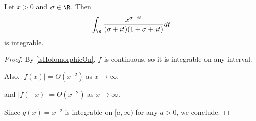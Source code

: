 \begin{lemma}[isIntegrable]
\label{isIntegrable}
\leanok
Let $x>0$ and $\sigma\in\R$. Then
  $$\int_{\R}\frac{x^{\sigma+it}}{(\sigma+it)(1+\sigma + it)}dt$$
  is integrable.
\end{lemma}
\begin{proof}
\leanok
By \ref{isHolomorphicOn}, $f$ is continuous, so it is integrable on any interval.

Also, $|f(x)| = \Theta(x^{-2})$ as $x\to\infty$,

and $|f(-x)| = \Theta(x^{-2})$ as $x\to\infty$.

Since $g(x) = x^{-2}$ is integrable on $[a,\infty)$ for any $a>0$, we conclude.
\end{proof}
